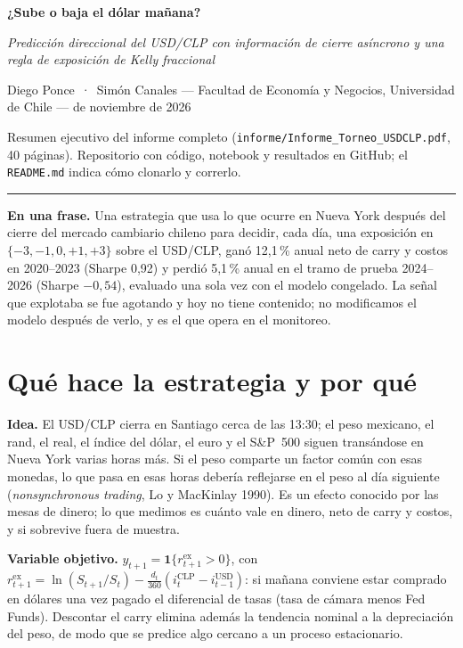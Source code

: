\documentclass[11pt,a4paper]{article}
\newcommand{\rex}{r^{\text{ex}}}
\begin{document}
\begin{center}
{\large\bfseries ¿Sube o baja el dólar mañana?\par}
{\small\itshape Predicción direccional del USD/CLP con información de cierre asíncrono y una regla de exposición de Kelly fraccional\par}
\vspace{2pt}
{\small Diego Ponce \,·\, Simón Canales \quad — \quad Facultad de Economía y Negocios, Universidad de Chile \quad —  de noviembre de 2026\par}
\vspace{2pt}
{\footnotesize Resumen ejecutivo del informe completo (\texttt{informe/Informe\_Torneo\_USDCLP.pdf}, 40 páginas). Repositorio con código, notebook y resultados en GitHub; el \texttt{README.md} indica cómo clonarlo y correrlo.\par}
\end{center}
\vspace{-2pt}\hrule\vspace{4pt}

\textbf{En una frase.} Una estrategia que usa lo que ocurre en Nueva York después del cierre del mercado cambiario chileno para decidir, cada día, una exposición en $\{-3,-1,0,+1,+3\}$ sobre el USD/CLP, ganó 12,1\,\% anual neto de carry y costos en 2020--2023 (Sharpe 0,92) y perdió 5,1\,\% anual en el tramo de prueba 2024--2026 (Sharpe $-0{,}54$), evaluado una sola vez con el modelo congelado. La señal que explotaba se fue agotando y hoy no tiene contenido; no modificamos el modelo después de verlo, y es el que opera en el monitoreo.

\section{Qué hace la estrategia y por qué}

\textbf{Idea.} El USD/CLP cierra en Santiago cerca de las 13:30; el peso mexicano, el rand, el real, el índice del dólar, el euro y el S\&P~500 siguen transándose en Nueva York varias horas más. Si el peso comparte un factor común con esas monedas, lo que pasa en esas horas debería reflejarse en el peso al día siguiente (\emph{nonsynchronous trading}, Lo y MacKinlay 1990). Es un efecto conocido por las mesas de dinero; lo que medimos es cuánto vale en dinero, neto de carry y costos, y si sobrevive fuera de muestra.

\textbf{Variable objetivo.} $y_{t+1}=\mathbf 1\{\rex_{t+1}>0\}$, con $\rex_{t+1}=\ln(S_{t+1}/S_t)-\tfrac{d_t}{360}(i^{\text{CLP}}_t-i^{\text{USD}}_{t-1})$: si mañana conviene estar comprado en dólares una vez pagado el diferencial de tasas (tasa de cámara menos Fed Funds). Descontar el carry elimina además la tendencia nominal a la depreciación del peso, de modo que se predice algo cercano a un proceso estacionario.
\end{document}
